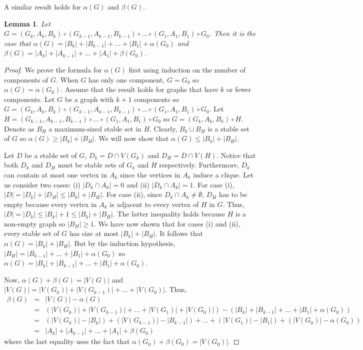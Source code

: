 \documentclass[11pt]{article}
\newtheorem{lemma}[df]{Lemma}
\begin{document}
A similar result holds for $\alpha(G)$ and $\beta(G)$.

\begin{lemma}
Let $G= (G_k , A_k, B_k) \circ (G_{k-1}, A_{k-1}, B_{k-1})  \circ \hdots \circ (G_1, A_1, B_1) \circ G_0$. Then it is the case that $\alpha(G) = |B_k| + |B_{k-1}|+ \hdots + |B_1| + \alpha(G_0)$ and $\beta(G) = |A_k| + |A_{k-1}|+ \hdots + |A_1| + \beta(G_0)$.
\label{lemmaWhitman2}
\end{lemma}


\begin{proof}
We prove the formula for $\alpha(G)$ first using induction on the number of components of $G$.   When $G$ has only one component, $G = G_0$ so $\alpha(G) = \alpha(G_0)$.   Assume that the result holds for graphs that have $k$ or fewer components.  Let $G$ be a graph with $k+1$ components so $G= (G_k , A_k, B_k) \circ (G_{k-1}, A_{k-1}, B_{k-1})  \circ \hdots \circ (G_1, A_1, B_1) \circ G_0$. Let $H = (G_{k-1}, A_{k-1}, B_{k-1})  \circ \hdots \circ (G_1, A_1, B_1) \circ G_0$ so $G = (G_k, A_k, B_k) \circ H$.   Denote as $B_H$   a maximum-sized stable set in $H$.  Clearly, $B_k \cup B_H$ is a stable set of $G$ so $\alpha(G) \ge |B_k| + |B_H|$.  We will now show that $\alpha(G) \leq |B_k| + |B_H|$.

 Let $D$ be a stable set of $G$,  $D_k = D \cap V(G_k)$ and $D_H = D \cap V(H)$.  Notice that both $D_k$ and $D_H$ must be stable sets of $G_k$ and $H$ respectively.  Furthermore,  $D_k$ can contain at most one vertex in $A_k$ since the vertices in $A_k$ induce a clique.  Let us consider two cases:  (i) $|D_k \cap A_k| = 0$ and (ii) $|D_k \cap A_k| = 1$.  For case (i),  $|D| = |D_k| + |D_H| \leq |B_k| + |B_H|$.    For case (ii), since $D_k \cap A_k \neq \emptyset$,  $D_H$ has to be empty because  every vertex in $A_k$ is adjacent to every vertex of $H$ in $G$.  Thus,  $|D| = |D_k|  \leq |B_k| + 1  \leq |B_k| + |B_H|$.  The latter inequality holds because $H$ is a non-empty graph so $|B_H| \ge 1$.  We have now shown that for cases (i) and (ii), every stable set of $G$ has size at most $|B_k| + |B_H|$.  It follows that $\alpha(G) = |B_k| + |B_H|$.  But by the induction hypothesis, $|B_H| = |B_{k-1}|+ \hdots + |B_1| + \alpha(G_0)$ so $\alpha(G) = |B_k| + |B_{k-1}|+ \hdots + |B_1| + \alpha(G_0)$. 
 
 Now, $\alpha(G) + \beta(G) = |V(G)|$ and $|V(G)| = |V(G_k)| + |V(G_{k-1})| + \hdots +  |V(G_0)|$.   Thus, 
 \begin{eqnarray*}
 \beta(G) & = &  |V(G)| - \alpha(G) \\
                & = & (|V(G_k)| + |V(G_{k-1})| + \hdots + |V(G_1)| + |V(G_0)|) - (|B_k| + |B_{k-1}|+ \hdots + |B_1| + \alpha(G_0)) \\
                & = & (|V(G_k)| - |B_k|) + (|V(G_{k-1})| - |B_{k-1}|) +  \hdots + (|V(G_1)| - |B_1|) + (|V(G_0)| - \alpha(G_0)) \\
                & = &  |A_k| + |A_{k-1}| + \hdots + |A_1| + \beta(G_0)
 \end{eqnarray*}
 where the last equality uses the fact that $\alpha(G_0) + \beta(G_0) = |V(G_0)|$.
\end{proof}
\end{document}
